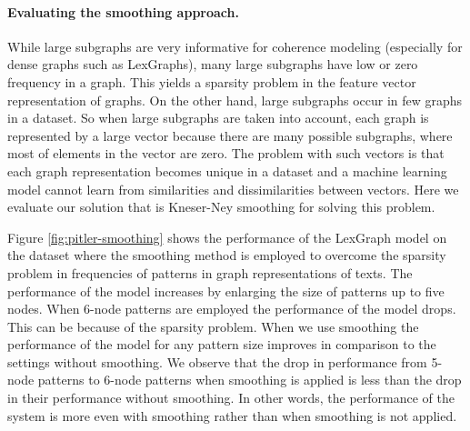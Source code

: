 \paragraph{Evaluating the smoothing approach.}
While large subgraphs are very informative for coherence modeling (especially for dense graphs such as LexGraphs), many large subgraphs have low or zero frequency in a graph.
This yields a sparsity problem in the feature vector representation of graphs. 
On the other hand, large subgraphs occur in few graphs in a dataset. 
So when large subgraphs are taken into account, each graph is represented by a large vector because there are many possible subgraphs, where most of elements in the vector are zero.   
The problem with such vectors is that each graph representation becomes unique in a dataset and a machine learning model cannot learn from similarities and dissimilarities between vectors. 
Here we evaluate our solution that is \mbox{Kneser-Ney} smoothing for solving this problem. 

Figure \ref{fig:pitler-smoothing} shows the performance of the LexGraph model on the \pitlerds dataset where the smoothing method is employed to overcome the sparsity problem in frequencies of patterns in graph representations of texts. 
The performance of the model increases by enlarging the size of patterns up to five nodes. 
When 6-node patterns are employed the performance of the model drops. 
This can be because of the sparsity problem. 
When we use smoothing the performance of the model for any pattern size improves in comparison to the settings without smoothing.  
We observe that the drop in performance from 5-node patterns to 6-node patterns when smoothing is applied is less than the drop in their performance without smoothing.
In other words, the performance of the system is more even with smoothing rather than when smoothing is not applied. 


